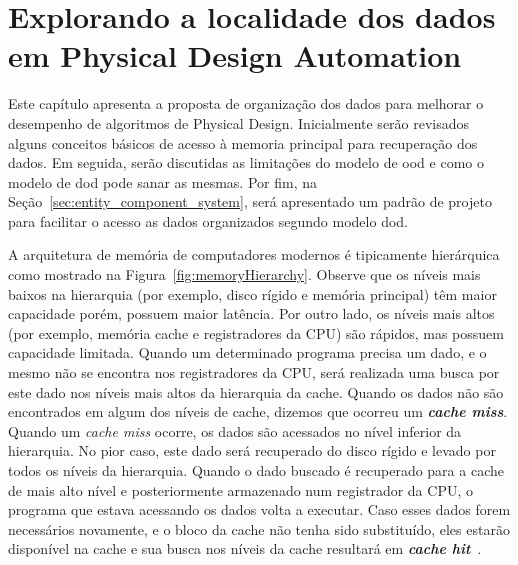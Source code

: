 \acresetall{}
\chapter{Explorando a localidade dos dados em Physical Design Automation}
\label{cap:tecnica_proposta}

Este capítulo apresenta a proposta de organização dos dados para melhorar o desempenho de algoritmos de Physical Design.
Inicialmente serão revisados alguns conceitos básicos de acesso à memoria principal para recuperação dos dados.
Em seguida, serão discutidas as limitações do modelo de \ac{ood} e como o modelo de \ac{dod} pode sanar as mesmas.
Por fim, na Seção~\ref{sec:entity_component_system}, será apresentado um padrão de projeto para facilitar o acesso as dados organizados segundo modelo \ac{dod}.

A arquitetura de memória de computadores modernos é tipicamente hierárquica como mostrado na Figura~\ref{fig:memoryHierarchy}. Observe que os níveis mais baixos na hierarquia (por exemplo, disco rígido e memória principal) têm maior capacidade porém, possuem maior latência. Por outro lado, os níveis mais altos (por exemplo, memória cache e registradores da CPU) são rápidos, mas possuem capacidade limitada. Quando um determinado programa precisa um dado, e o mesmo não se encontra nos registradores da CPU, será realizada uma busca por este dado nos níveis mais altos da hierarquia da  cache. Quando os dados não são encontrados em algum dos níveis de cache, dizemos que ocorreu um \textbf{\textit{cache miss}}. Quando um \textit{cache miss} ocorre, os dados são acessados no nível inferior da hierarquia. No pior caso, este dado será recuperado do disco rígido e levado por todos os níveis da hierarquia. Quando o dado buscado é recuperado para a cache de mais alto nível e posteriormente armazenado num registrador da CPU, o programa que estava acessando os dados volta a executar. Caso esses dados forem necessários novamente, e o bloco da cache não tenha sido substituído, eles estarão disponível na cache e sua busca nos níveis da cache resultará em \textbf{\textit{cache hit}}~\cite{patterson2013computer}.

